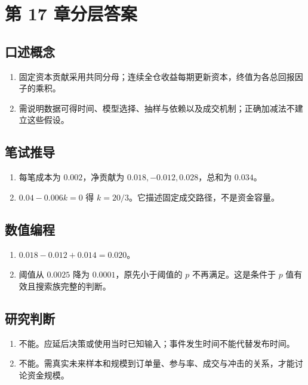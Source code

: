 \chapter{第 17 章分层答案}
\label{app:ch17-solutions}
\section*{口述概念}
\begin{enumerate}[leftmargin=*]
  \item 固定资本贡献采用共同分母；连续全仓收益每期更新资本，终值为各总回报因子的乘积。
  \item 需说明数据可得时间、模型选择、抽样与依赖以及成交机制；正确加减法不建立这些假设。
\end{enumerate}
\section*{笔试推导}
\begin{enumerate}[leftmargin=*]
  \item 每笔成本为 $0.002$，净贡献为 $0.018,-0.012,0.028$，总和为 $0.034$。
  \item $0.04-0.006k=0$ 得 $k=20/3$。它描述固定成交路径，不是资金容量。
\end{enumerate}
\section*{数值编程}
\begin{enumerate}[leftmargin=*]
  \item $0.018-0.012+0.014=0.020$。
  \item 阈值从 $0.0025$ 降为 $0.0001$，原先小于阈值的 $p$ 不再满足。这是条件于 $p$ 值有效且搜索族完整的判断。
\end{enumerate}
\section*{研究判断}
\begin{enumerate}[leftmargin=*]
  \item 不能。应延后决策或使用当时已知输入；事件发生时间不能代替发布时间。
  \item 不能。需真实未来样本和规模到订单量、参与率、成交与冲击的关系，才能讨论资金规模。
\end{enumerate}
